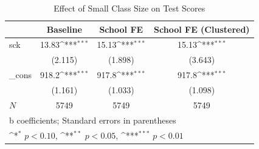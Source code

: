 \begin{table}[htbp]\centering
\def\sym#1{\ifmmode^{#1}\else\(^{#1}\)\fi}
\caption{Effect of Small Class Size on Test Scores}
\begin{tabular}{l*{3}{c}}
\hline\hline
            &\multicolumn{1}{c}{Baseline}&\multicolumn{1}{c}{School FE}&\multicolumn{1}{c}{School FE (Clustered)}\\
\hline
sck         &       13.83\sym{***}&       15.13\sym{***}&       15.13\sym{***}\\
            &     (2.115)         &     (1.898)         &     (3.643)         \\
[1em]
\_cons      &       918.2\sym{***}&       917.8\sym{***}&       917.8\sym{***}\\
            &     (1.161)         &     (1.033)         &     (1.098)         \\
\hline
\(N\)       &        5749         &        5749         &        5749         \\
\hline\hline
\multicolumn{4}{l}{\footnotesize b coefficients; Standard errors in parentheses}\\
\multicolumn{4}{l}{\footnotesize \sym{*} \(p<0.10\), \sym{**} \(p<0.05\), \sym{***} \(p<0.01\)}\\
\end{tabular}
\end{table}
